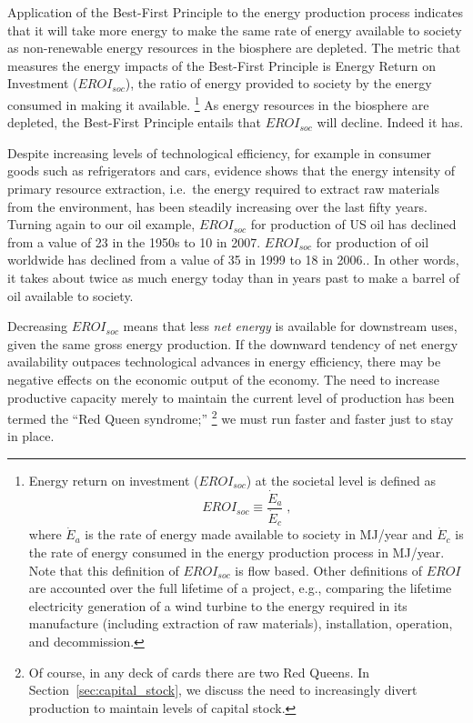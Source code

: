 Application of the Best-First Principle to the energy production process 
indicates that it will take more energy 
to make the same rate of energy available to society as non-renewable 
energy resources in the biosphere are depleted.
The metric that measures the energy impacts of the Best-First Principle is 
Energy Return on Investment ($EROI_{soc}$), 
the ratio of energy provided to society 
by the energy consumed in making it available.%
	\footnote{
	Energy return on investment ($EROI_{soc}$) at the societal level is defined as 
	\begin{equation*}
		EROI_{soc} \equiv \frac{\dot{E}_a}{\dot{E}_c} \; ,
	\end{equation*}
	where $\dot{E}_a$ is the rate of energy made available to society in MJ/year
	and $\dot{E}_c$ is the rate of energy consumed in the energy production process in MJ/year.
	Note that this definition of $EROI_{soc}$ is flow based.
	Other definitions of $EROI$ are accounted over the full lifetime of a project,
	e.g., comparing the lifetime electricity generation of a wind turbine
	to the energy required in its 
	manufacture (including extraction of raw materials),
	installation,
	operation, and
	decommission.
	}
As energy resources in the biosphere are depleted, 
the Best-First Principle entails that
$EROI_{soc}$ will decline.
Indeed it has.

Despite increasing levels of technological efficiency, 
for example in consumer goods such as refrigerators and cars, 
evidence shows that 
the energy intensity of primary resource extraction, 
i.e.\ the energy required to extract raw materials 
from the environment, 
has been steadily increasing over 
the last fifty years.\cite{Hall1986, Mudd2010, Brandt2011} 
Turning again to our oil example, $EROI_{soc}$ for production of US oil has declined 
from a value of 23 in the 1950s
to 10 in 2007.\cite[Fig.~2]{Guilford:2011ci}
$EROI_{soc}$ for production of oil worldwide has declined 
from a value of 35 in 1999
to 18 in 2006.\cite[Fig.~1]{Gagnon:2009fc}.
In other words, it takes about twice as much energy today
than in years past
to make a barrel of oil available to society.

Decreasing $EROI_{soc}$ means that 
less \emph{net energy} is available 
for downstream uses, given the same gross energy production.
If the downward tendency of net energy availability 
outpaces technological advances in energy efficiency, 
there may be negative effects on the 
economic output of the economy.
The need to increase productive capacity 
merely to maintain
the current level of production has been termed 
the ``Red Queen syndrome;''%
	\footnote{
	Of course,
	in any deck of cards there are two Red Queens.
	In Section~\ref{sec:capital_stock},
	we discuss the need to increasingly divert production
	to maintain levels of capital stock.
	}
we must run faster and faster just to stay in place.\cite{Ross1988}

